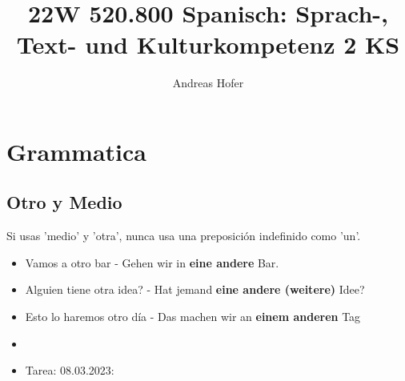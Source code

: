 \documentclass{article}
\title{\vspace{-3cm}22W 520.800 Spanisch: Sprach-, Text- und Kulturkompetenz 2 KS}
\author{Andreas Hofer}
\begin{document}
	\section{Grammatica}
	\subsection{Otro y Medio}
	Si usas 'medio' y 'otra', nunca usa una preposición indefinido como 'un'. \\
	\begin{itemize}
		\item{Vamos a otro bar - Gehen wir in \textbf{eine andere} Bar.}
		\item{Alguien tiene otra idea? - Hat jemand \textbf{eine andere (weitere)} Idee?}
		\item{Esto lo haremos otro día - Das machen wir an \textbf{einem anderen} Tag}
		\item{}
	\end{itemize}

	\begin{itemize}
		\item{Tarea: 08.03.2023: }
	\end{itemize}
	
\end{document}
